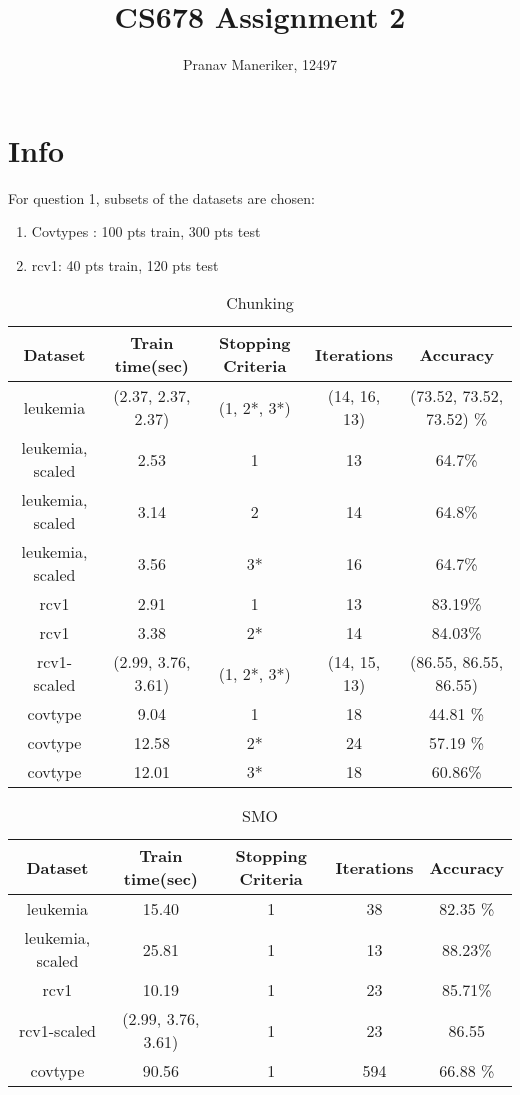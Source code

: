 \documentclass{article}
\title{CS678 Assignment 2}
\author{Pranav Maneriker, 12497}
\begin{document}
\maketitle
\section{Info}
For question 1, subsets of the datasets are chosen:
\begin{enumerate}
\item Covtypes : 100 pts train, 300 pts test
\item rcv1: 40 pts train, 120 pts test
\end{enumerate}
\begin{table}
\begin{tabular}{|c|c|c|c|c|}
\hline
\textbf{Dataset} & \textbf{Train time(sec)} & \textbf{Stopping Criteria} & \textbf{Iterations} & \textbf{Accuracy} \\ \hline
leukemia         & (2.37, 2.37, 2.37)  & (1, 2*, 3*)   & (14, 16, 13) & (73.52, 73.52, 73.52) \% \\ \hline
leukemia, scaled & 2.53  & 1   & 13 & 64.7\% \\ \hline
leukemia, scaled & 3.14  & 2   & 14 & 64.8\% \\ \hline
leukemia, scaled & 3.56  & 3*   & 16 & 64.7\% \\ \hline
rcv1			 & 2.91  & 1    & 13 & 83.19\% \\ \hline
rcv1			 & 3.38  & 2*  & 14  & 84.03\% \\ \hline
rcv1-scaled 	 & (2.99, 3.76, 3.61) & (1, 2*, 3*) & (14, 15, 13) & (86.55, 86.55, 86.55) \\ \hline
covtype          & 9.04  & 1   & 18 & 44.81 \% \\ \hline
covtype          & 12.58 & 2*  & 24 & 57.19 \% \\ \hline
covtype          & 12.01 & 3*  & 18 & 60.86\% \\ \hline

\end{tabular}
\caption{Chunking}
\end{table}

\begin{table}
\begin{tabular}{|c|c|c|c|c|}
\hline
\textbf{Dataset} & \textbf{Train time(sec)} & \textbf{Stopping Criteria} & \textbf{Iterations} & \textbf{Accuracy} \\ \hline
leukemia         & 15.40  & 1   & 38 & 82.35 \% \\ \hline
leukemia, scaled & 25.81  & 1   & 13 & 88.23\% \\ \hline
rcv1			 & 10.19  & 1    & 23 & 85.71\% \\ \hline
rcv1-scaled 	 & (2.99, 3.76, 3.61) & 1 & 23 & 86.55 \\ \hline
covtype          & 90.56  & 1   & 594 & 66.88 \% \\ \hline

\end{tabular}
\caption{SMO}
\end{table}
\end{document}
